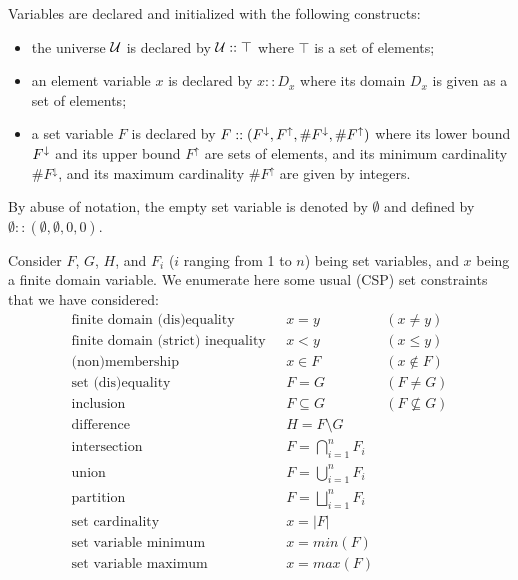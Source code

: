 \documentclass[3p,authoryear,times]{elsarticle}
\newcommand{\MS}[1]{{{#1}^{\uparrow}}}
\newcommand{\ms}[1]{{\MakeUppercase{#1}^\downarrow}}
\newcommand{\MSF}[0]{\MS{F}}
\newcommand{\msF}[0]{\ms{f}}
\newcommand{\MC}[1]{{\#{#1}^\uparrow{}}}
\newcommand{\mc}[1]{{\#{#1}^\downarrow}}
\newcommand{\MCF}[0]{\MC{F}{}}
\newcommand{\mcF}[0]{\mc{F}{}}
\begin{document}
Variables are declared and initialized with the following constructs:
\begin{itemize}

\item the universe ${\cal U}$ is declared by ${{\cal U}::\top}$ where $\top$ is a set of elements;%
\item an element variable $x$ is declared by ${x::D_x}$ where its domain $D_x$ is given as a set of elements; %
\item a set variable $F$ is declared by ${F:: (\msF{},\MSF{},\mcF{},\MCF{})}$ where its lower bound $\msF$ and its upper bound $\MSF$ are sets of elements,
and its minimum cardinality $\mcF$, and its maximum cardinality $\MCF$ are given by integers.
\end{itemize}
By abuse of notation, the empty set variable is denoted by $\emptyset$ and defined by 
 $\emptyset::(\emptyset,\emptyset,0,0)$.


Consider $F$, $G$, $H$, and $F_i$ ($i$ ranging from 1 to $n$) being set variables, and $x$ being a finite domain variable. We enumerate here some usual (CSP) set constraints that we have considered:
\[
\begin{array}{lll}
\textrm{finite domain (dis)equality~~}& x=y~~~~& (x \not =y)\\
\textrm{finite domain (strict) inequality~~}& x<y~~~~& (x \leq y)\\
\textrm{(non)membership~~}& x \in F ~~~~& (x \not \in F)\\
\textrm{set (dis)equality~~}& F = G ~~~~& (F \not = G)\\
\textrm{inclusion~~}& F \subseteq G ~~~~& (F \not \subseteq G)\\
\textrm{difference~~}& H = F \setminus G\\
\textrm{intersection~~}& F = \bigcap_{i=1}^{n}F_i \\
\textrm{union~~}& F = \bigcup_{i=1}^{n}F_i \\
\textrm{partition~~}& F = \bigsqcup_{i=1}^{n}F_i \\
\textrm{set cardinality} ~~&x=|F|\\
\textrm{set variable minimum} ~~&x=min(F)\\
\textrm{set variable maximum} ~~&x=max(F)\\
\end{array}
\]
\end{document}
